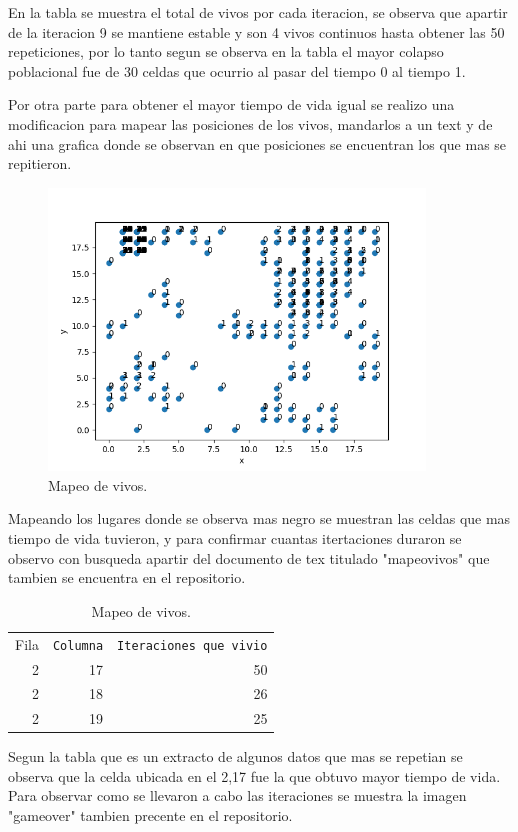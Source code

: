 \documentclass{article}
\begin{document}
En la tabla  se muestra el total de vivos por cada iteracion, se observa que apartir de la iteracion 9 se mantiene estable y son 4 vivos continuos hasta obtener las 50 repeticiones, por lo tanto segun se observa en la tabla \cite{t1} el mayor colapso poblacional fue de 30 celdas que ocurrio al pasar del tiempo 0 al tiempo 1.

Por otra parte para obtener el mayor tiempo de vida igual se realizo una modificacion para mapear las posiciones de los vivos, mandarlos a un text y de ahi una grafica donde se observan en que posiciones se encuentran los que mas se repitieron.

\begin{figure}
  \begin{center}
    \includegraphics[width=10cm]{posiciones.png}
  \end{center}
  \caption{Mapeo de vivos.}
  \label{f1}
\end{figure}

Mapeando los lugares donde se observa mas negro se muestran las celdas que mas tiempo de vida tuvieron, y para confirmar cuantas itertaciones duraron se observo con busqueda apartir del documento de tex \cite{ana} titulado "mapeovivos" que tambien se encuentra en el repositorio.

\begin{table}
  \caption{Mapeo de vivos.}
  \label{t2}
  \begin{center}
    \begin{tabular}{rrr}
      Fila & \texttt{Columna} & \texttt{Iteraciones que vivio} \\
      2 &  17    & 50     \\
      2  &  18   &  26    \\
      2  &  19    & 25   \\
    \end{tabular}
    \end{center}
  \end{table}
Segun la tabla \cite{t2} que es un extracto de algunos datos que mas se repetian se observa que la celda ubicada en el 2,17 fue la que obtuvo mayor tiempo de vida.
Para observar como se llevaron a cabo las iteraciones se muestra la imagen \cite{ana} "gameover" tambien precente en el repositorio.
\end{document}

